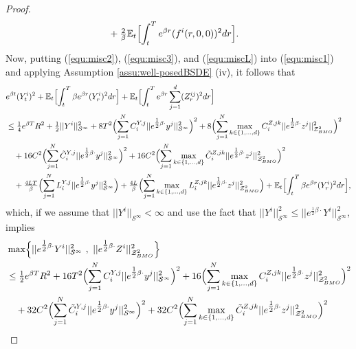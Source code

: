 \documentclass[10pt,a4paper]{article}
\theoremstyle{plain}
\theoremstyle{definition}
\numberwithin{equation}{section}
\begin{document}
\begin{proof}
\begin{align}
&+\tfrac{2}{\beta}\mathbb{E}_{t}\Bigl[\int_{t}^{T}e^{\beta r}(f^{i}(r,0,0))^{2}dr\Bigr]. \label{equ:miscL}
\end{align}
Now, putting (\ref{equ:misc2}), (\ref{equ:misc3}), and (\ref{equ:miscL}) into (\ref{equ:misc1}) and applying Assumption \ref{assu:well-posedBSDE} (iv), it follows that
\begin{align*}
&e^{\beta t}(Y_{t}^{i})^{2} + \mathbb{E}_{t}\Bigl[\int_{t}^{T}\beta e^{\beta r}(Y_{r}^{i})^{2}dr\Bigr] + \mathbb{E}_{t}\Bigl[\int_{t}^{T}e^{\beta r}\sum_{j=1}^{d}(Z_{r}^{ij})^{2}dr\Bigr] \\
&\leq \tfrac{1}{4}e^{\beta T}R^{2} + \tfrac{1}{2}||Y^{i}||_{\mathcal{S}^{\infty}}^{2} + 8T^{2}\Bigl(\sum_{j=1}^{N}C_{i}^{Y,j}||e^{\tfrac{1}{2}\beta\cdot}y^{j}||_{\mathcal{S}^{\infty}}^{2}\Bigr)^{2} + 8\Bigl(\sum_{j=1}^{N}\max_{k \in \{1,...,d\}}C_{i}^{Z,jk}||e^{\tfrac{1}{2}\beta\cdot}z^{j}||_{\mathcal{Z}_{BMO}^{2}}^{2}\Bigr)^{2} \\
&\ \ \ +16C^{2}\Bigl(\sum_{j=1}^{N}\tilde{C}_{i}^{Y,j}||e^{\tfrac{1}{2}\beta\cdot}y^{j}||_{\mathcal{S}^{\infty}}^{2}\Bigr)^{2} + 16C^{2}\Bigl(\sum_{j=1}^{N}\max_{k \in \{1,...,d\}}\tilde{C}_{i}^{Z,jk}||e^{\tfrac{1}{2}\beta\cdot}z^{j}||_{\mathcal{Z}_{BMO}^{2}}^{2}\Bigr)^{2} \\
&\ \ \ + \tfrac{4LT}{\beta}\Bigl(\sum_{j=1}^{N}L_{i}^{Y,j}||e^{\tfrac{1}{2}\beta\cdot}y^{j}||_{\mathcal{S}^{\infty}}^{2}\Bigr) + \tfrac{4L}{\beta}\Bigl(\sum_{j=1}^{N}\max_{k \in \{1,...,d\}}L_{i}^{Z,jk}||e^{\tfrac{1}{2}\beta\cdot}z^{j}||_{\mathcal{Z}_{BMO}^{2}}^{2}\Bigr) + \mathbb{E}_{t}\Bigl[\int_{t}^{T}\beta e^{\beta r}(Y_{r}^{i})^{2}dr\Bigr],
\end{align*}
which, if we assume that $||Y^{i}||_{\mathcal{S}^{\infty}}<\infty$ and use the fact that $||Y^{i}||_{\mathcal{S}^{\infty}}^{2} \leq ||e^{\tfrac{1}{2}\beta\cdot}Y^{i}||_{\mathcal{S}^{\infty}}^{2}$, implies
\begin{align}
&\max\Bigl\{||e^{\tfrac{1}{2}\beta\cdot}Y^{i}||_{\mathcal{S}^{\infty}}^{2} \ , \ ||e^{\tfrac{1}{2}\beta\cdot}Z^{i}||_{\mathcal{Z}_{BMO}^{2}}^{2}\Bigr\} \nonumber \\
&\leq \tfrac{1}{2}e^{\beta T}R^{2} + 16T^{2}\Bigl(\sum_{j=1}^{N}C_{i}^{Y,j}||e^{\tfrac{1}{2}\beta\cdot}y^{j}||_{\mathcal{S}^{\infty}}^{2}\Bigr)^{2} + 16\Bigl(\sum_{j=1}^{N}\max_{k \in \{1,...,d\}}C_{i}^{Z,jk}||e^{\tfrac{1}{2}\beta\cdot}z^{j}||_{\mathcal{Z}_{BMO}^{2}}^{2}\Bigr)^{2} \nonumber \\
&\ \ \ + 32C^{2}\Bigl(\sum_{j=1}^{N}\tilde{C}_{i}^{Y,j}||e^{\tfrac{1}{2}\beta\cdot}y^{j}||_{\mathcal{S}^{\infty}}^{2}\Bigr)^{2}  + 32C^{2}\Bigl(\sum_{j=1}^{N}\max_{k \in \{1,...,d\}}\tilde{C}_{i}^{Z,jk}||e^{\tfrac{1}{2}\beta\cdot}z^{j}||_{\mathcal{Z}_{BMO}^{2}}^{2}\Bigr)^{2} \nonumber \\

\end{align}
\end{proof}
\end{document}
